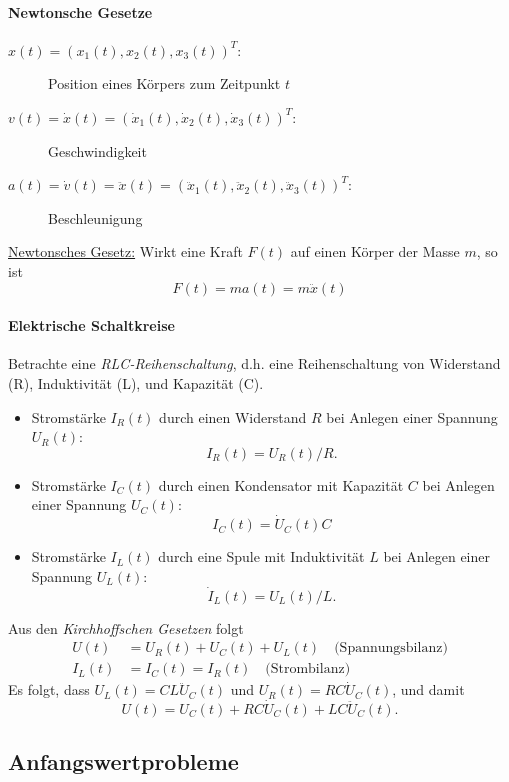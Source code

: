 \documentclass[12pt,a4paper]{book}
\theoremstyle{break}
\theoremstyle{nonumberplain}
\newcommand{\1}{\mathbbm{1}} 			      	%
\begin{document}
\paragraph{Newtonsche Gesetze}

\begin{description}
\item[$x(t)=(x_1(t), x_2(t), x_3(t))^T$:] Position eines Körpers zum Zeitpunkt $t$ 
\item[$v(t)=\dot x(t)=(\dot x_1(t), \dot x_2(t), \dot x_3(t))^T$:] Geschwindigkeit
\item[$a(t)=\dot v(t)=  \ddot x(t)=(\ddot x_1(t), \ddot x_2(t), \ddot x_3(t))^T$:] Beschleunigung
\end{description}

\underline{Newtonsches Gesetz:} Wirkt eine Kraft $F(t)$ auf einen Körper der Masse $m$, so ist
\[
F(t)= m a(t) = m \ddot x(t)
\]
%
\paragraph{Elektrische Schaltkreise}

Betrachte eine \emph{RLC-Reihenschaltung}, d.h. eine Reihenschaltung von Widerstand (R), 
Induktivität (L), und Kapazität (C). 
\begin{itemize}
\item Stromstärke $I_R(t)$ durch einen Widerstand $R$ bei Anlegen einer Spannung $U_R(t)$:
\[
I_R(t)= U_R(t) / R.
\]
\item Stromstärke $I_C(t)$ durch einen Kondensator mit Kapazität $C$ bei Anlegen einer Spannung $U_C(t)$:
\[
I_C(t)= \dot U_C(t) C 
\]
\item Stromstärke $I_L(t)$ durch eine Spule mit Induktivität $L$ bei Anlegen einer Spannung
$U_L(t)$:
\[
\dot I_L(t)= U_L(t)/L.
\]
\end{itemize}

Aus den \emph{Kirchhoffschen Gesetzen} folgt
\begin{align*}
U(t)&=U_R(t)+U_C(t)+U_L(t) \quad \mbox{(Spannungsbilanz)}\\
I_L(t)&=I_C(t)=I_R(t) \quad \mbox{(Strombilanz)}
\end{align*}
Es folgt, dass $U_L(t)=C L \ddot U_C(t)$ und $U_R(t)=R C \dot U_C(t)$, und damit
\[
U(t)=U_C(t)+RC\dot U_C(t) + LC \ddot U_C(t).
\]


\subsection{Anfangswertprobleme}
\end{document}
